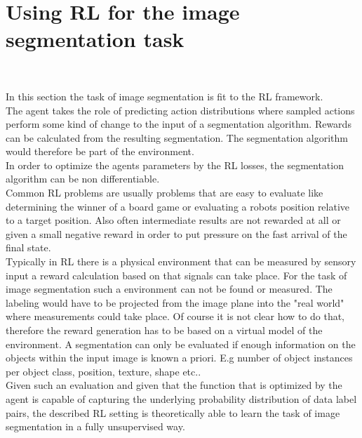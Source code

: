 \section{Using RL for the image segmentation task}~\label{sec:rl_for_seg}

In this section the task of image segmentation is fit to the RL framework.\\
The agent takes the role of predicting action distributions where sampled actions perform some kind of change to the input of a segmentation algorithm. Rewards can be calculated from the resulting segmentation. The segmentation algorithm would therefore be part of the environment. \\
In order to optimize the agents parameters by the RL losses, the segmentation algorithm can be non differentiable.\\
Common RL problems are usually problems that are easy to evaluate like determining the winner of a board game or evaluating a robots position relative to a target position. Also often intermediate results are not rewarded at all or given a small negative reward in order to put pressure on the fast arrival of the final state.\\
Typically in RL there is a physical environment that can be measured by sensory input a reward calculation based on that signals can take place. For the task of image segmentation such a environment can not be found or measured. The labeling would have to be projected from the image plane into the "real world" where measurements could take place. Of course it is not clear how to do that, therefore the reward generation has to be based on a virtual model of the environment. A segmentation can only be evaluated if enough information on the objects within the input image is known a priori. E.g number of object instances per object class, position, texture, shape etc..\\
Given such an evaluation and given that the function that is optimized by the agent is capable of capturing the underlying probability distribution of data label pairs, the described RL setting is theoretically able to learn the task of image segmentation in a fully unsupervised way.\\

